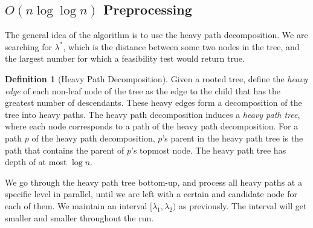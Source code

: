 \documentclass[11pt,a4paper]{article}
\theoremstyle{definition}
\newtheorem{definition}{Definition}
\theoremstyle{remark}
\begin{document}
\subsection{\boldmath$O(n\log\log n)$ Preprocessing} 
The general idea of the algorithm is to use the heavy path decomposition. We are searching for $\lambda^*$, which is the distance between some two nodes in the tree, and the largest number for which a feasibility test would return true.
\begin{definition}[Heavy Path Decomposition] \cite{Sleator1983} Given a rooted tree, define the \emph{heavy edge} of each non-leaf node of the tree as the edge to the child that has the greatest number of descendants. These heavy edges form a decomposition of the tree into heavy paths. The heavy path decomposition induces a \emph{heavy path tree}, where each node corresponds to a path of the heavy path decomposition. For a path $p$ of the heavy path decomposition, $p$'s parent in the heavy path tree is the path that contains the parent of $p$'s topmost node. The heavy path tree has depth of at most $\log n$. %
\end{definition}
We go through the heavy path tree bottom-up, and process all heavy paths at a specific level in parallel, until we are left with a certain and candidate node for each of them. We maintain an interval $[\lambda_1,\lambda_2)$ as previously. The interval will get smaller and smaller throughout the run.
\end{document}
